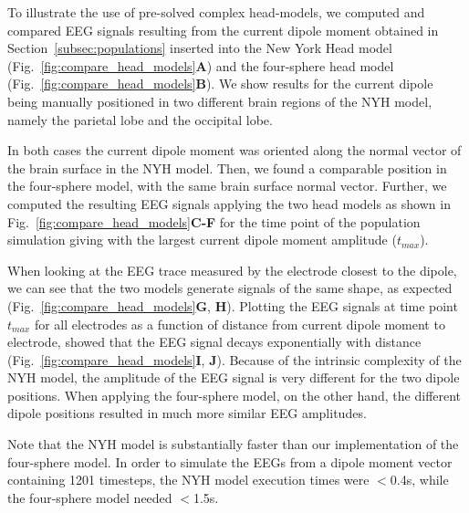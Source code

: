 \documentclass[preprint,10pt,authoryear]{elsarticle}
\newcommand{\hlb}[2][NavyBlue]{ {\sethlcolor{#1} \hl{#2}} }
\newcommand{\hlg}[2][Emerald]{ {\sethlcolor{#1} \hl{#2}} }
\newcommand{\snnote}[1]{\color{white}{\hlb{SN: #1 }}\color{black}}
\newcommand{\sntxt}[1]{{\color{NavyBlue}#1}}
\newcommand{\tvnnote}[1]{\color{white}{\hlg{TVN: #1 }}\color{black}}
\begin{document}

\sntxt{
To illustrate the use of pre-solved complex head-models, we computed and compared EEG signals resulting from the current dipole moment obtained in Section~\ref{subsec:populations} inserted into the New York Head model (Fig.~\ref{fig:compare_head_models}\textbf{A}) and the four-sphere head model (Fig.~\ref{fig:compare_head_models}\textbf{B}). We show results for the current dipole being manually positioned in two different brain regions of the NYH model, namely the parietal lobe and the occipital lobe.

In both cases the current dipole moment was oriented along the normal vector of the brain surface in the NYH model. Then, we found a comparable position in the four-sphere model, with the same brain surface normal vector. Further, we computed the resulting EEG signals applying the two head models as shown in Fig.~\ref{fig:compare_head_models}\textbf{C-F} for the time point of the population simulation giving with the largest current dipole moment amplitude ($t_{max}$). 

When looking at the EEG trace measured by the electrode closest to the dipole, we can see that the two models generate signals of the same shape, as expected (Fig.~\ref{fig:compare_head_models}{\bf G}, {\bf H}). Plotting the EEG signals at time point $t_{max}$ for all electrodes as a function of distance from current dipole moment to electrode, showed that the EEG signal decays exponentially with distance \citep{NUNEZ2006} (Fig.~\ref{fig:compare_head_models}{\bf I}, {\bf J}). Because of the intrinsic complexity of the NYH model, the amplitude of the EEG signal is very different for the two dipole positions. When applying the four-sphere model, on the other hand, the different dipole positions resulted in much more similar EEG amplitudes.

Note that the NYH model is substantially faster than our implementation of the four-sphere model. In order to simulate the EEGs from a dipole moment vector containing 1201 timesteps, the NYH model execution times were $<$0.4s, while the four-sphere model needed $<$1.5s.
}
\end{document}
